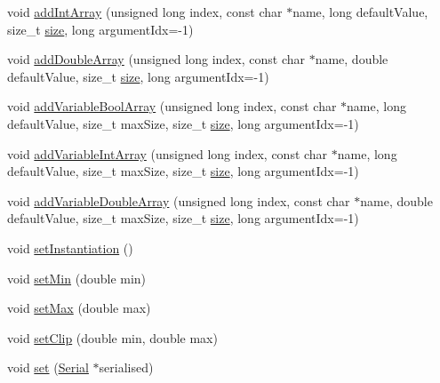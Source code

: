 \begin{DoxyCompactItemize}
\item 
void \hyperlink{class_frame_lib___parameters_a409ad961a1376b59eb9927894ee08d35}{add\+Int\+Array} (unsigned long index, const char $\ast$name, long default\+Value, size\+\_\+t \hyperlink{class_frame_lib___parameters_a391d0cb37c904981f7ad52bc0ba1b111}{size}, long argument\+Idx=-\/1)
\item 
void \hyperlink{class_frame_lib___parameters_adfdb57e149f9c14afabf37a39263ad16}{add\+Double\+Array} (unsigned long index, const char $\ast$name, double default\+Value, size\+\_\+t \hyperlink{class_frame_lib___parameters_a391d0cb37c904981f7ad52bc0ba1b111}{size}, long argument\+Idx=-\/1)
\item 
void \hyperlink{class_frame_lib___parameters_a7d29ce5a989b58dd19a00fccea66de9f}{add\+Variable\+Bool\+Array} (unsigned long index, const char $\ast$name, long default\+Value, size\+\_\+t max\+Size, size\+\_\+t \hyperlink{class_frame_lib___parameters_a391d0cb37c904981f7ad52bc0ba1b111}{size}, long argument\+Idx=-\/1)
\item 
void \hyperlink{class_frame_lib___parameters_abd0359eb3df2b07acf25ef5d1f2873fe}{add\+Variable\+Int\+Array} (unsigned long index, const char $\ast$name, long default\+Value, size\+\_\+t max\+Size, size\+\_\+t \hyperlink{class_frame_lib___parameters_a391d0cb37c904981f7ad52bc0ba1b111}{size}, long argument\+Idx=-\/1)
\item 
void \hyperlink{class_frame_lib___parameters_afefc06df8236e718674b7d7adac313ec}{add\+Variable\+Double\+Array} (unsigned long index, const char $\ast$name, double default\+Value, size\+\_\+t max\+Size, size\+\_\+t \hyperlink{class_frame_lib___parameters_a391d0cb37c904981f7ad52bc0ba1b111}{size}, long argument\+Idx=-\/1)
\item 
void \hyperlink{class_frame_lib___parameters_a29ca4962b55f16a90fd54a246fb17810}{set\+Instantiation} ()
\item 
void \hyperlink{class_frame_lib___parameters_ad3ade0db8b31a6cc85f4b66b6ad94cca}{set\+Min} (double min)
\item 
void \hyperlink{class_frame_lib___parameters_a921441264480d6e01d6053c21d98a8f8}{set\+Max} (double max)
\item 
void \hyperlink{class_frame_lib___parameters_aadd3ae63aa5ea79bc65f16bc892522e3}{set\+Clip} (double min, double max)
\item 
void \hyperlink{class_frame_lib___parameters_a1028e3913b7f38000f71ce4b172143a7}{set} (\hyperlink{class_frame_lib___parameters_1_1_serial}{Serial} $\ast$serialised)
\item 

\end{DoxyCompactItemize}
